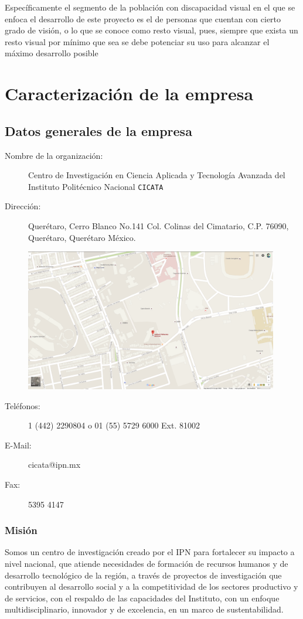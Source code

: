 \documentclass[12pt]{book} %
\begin{document}
	Específicamente el segmento de la población con discapacidad visual en el que se enfoca el desarrollo de este
	proyecto es el de personas que cuentan con cierto grado de visión, o lo que se conoce como resto visual, pues,
	siempre que exista un resto visual por mínimo que sea se debe potenciar su uso para alcanzar el máximo desarrollo
	posible

\newpage 
\section{Caracterización de la empresa}
	\subsection{Datos generales de la empresa}
	\begin{description}
		\item[Nombre de la organización:] Centro de Investigación en Ciencia Aplicada y Tecnología Avanzada del
			 Instituto Politécnico Nacional \texttt{CICATA}
			 
		\item[Dirección:] Querétaro, Cerro Blanco No.141 Col. Colinas del Cimatario, C.P. 76090, Querétaro, Querétaro
			 México.
			 \begin{center}
			 	\includegraphics[width=0.9\textwidth]{./imagenes/cicata}
			 \end{center}
		\item[Teléfonos:] 1 (442) 2290804 o 01 (55) 5729 6000 Ext. 81002
		\item[E-Mail:] cicata@ipn.mx 
		\item[Fax:] 5395 4147
	\end{description}
		\subsubsection{Misión}
			Somos un centro de investigación creado por el IPN para fortalecer su impacto a nivel nacional, que atiende
			necesidades de formación de recursos humanos y de desarrollo tecnológico de la región, a través de proyectos
			de investigación que contribuyen al desarrollo social y a la competitividad de los sectores productivo y de
			servicios, con el respaldo de las capacidades del Instituto, con un enfoque multidisciplinario, innovador y
			de excelencia, en un marco de sustentabilidad.
		
\end{document}
